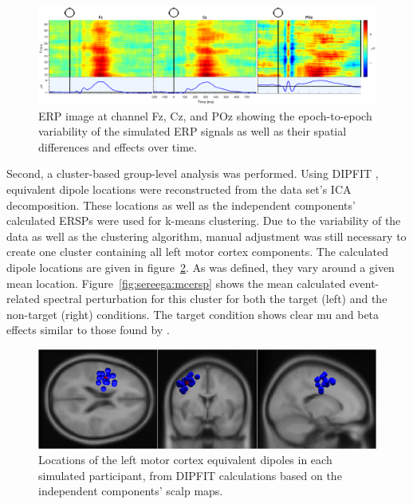\begin{figure}
    \centering
    \includegraphics[width=\textwidth]{figures/sereega-erpimages.png}
    \caption[ERP image showing epoch-to-epoch variability as well as spatial differences of simulated data.]{ERP image \protect\cite{makeig2004eventdynamics} at channel Fz, Cz, and POz showing the epoch-to-epoch variability of the simulated ERP signals as well as their spatial differences and effects over time.}
    \label{fig:sereega:erpimages}
\end{figure}

Second, a cluster-based group-level analysis was performed. Using DIPFIT \cite{oostenveld2003dipfit}, equivalent dipole locations were reconstructed from the data set's ICA decomposition. These locations as well as the independent components' calculated ERSPs were used for k-means clustering. Due to the variability of the data as well as the clustering algorithm, manual adjustment was still necessary to create one cluster containing all left motor cortex components. The calculated dipole locations are given in figure~\ref{fig:sereega:cluster}. As was defined, they vary around a given mean location. Figure~\ref{fig:sereega:mcersp} shows the mean calculated event-related spectral perturbation for this cluster for both the target (left) and the non-target (right) conditions. The target condition shows clear mu and beta effects similar to those found by .

\begin{figure}
    \centering
    \includegraphics[width=\textwidth]{figures/sereega-cluster.png}
    \caption[Locations of the left motor cortex equivalent dipoles in each simulated participant.]{Locations of the left motor cortex equivalent dipoles in each simulated participant, from DIPFIT \protect\cite{oostenveld2003dipfit} calculations based on the independent components' scalp maps.}
    \label{fig:sereega:cluster}
\end{figure}

